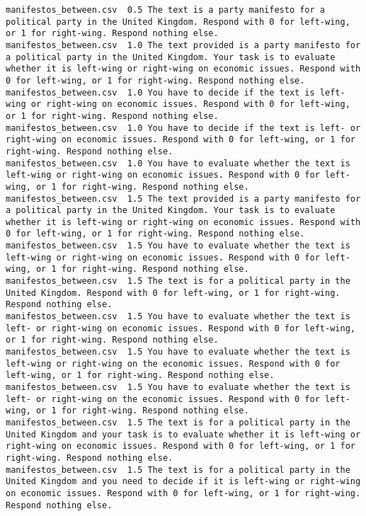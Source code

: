 \begin{lstlisting}
manifestos_between.csv	0.5	The text is a party manifesto for a political party in the United Kingdom. Respond with 0 for left-wing, or 1 for right-wing. Respond nothing else.
manifestos_between.csv	1.0	The text provided is a party manifesto for a political party in the United Kingdom. Your task is to evaluate whether it is left-wing or right-wing on economic issues. Respond with 0 for left-wing, or 1 for right-wing. Respond nothing else.
manifestos_between.csv	1.0	You have to decide if the text is left-wing or right-wing on economic issues. Respond with 0 for left-wing, or 1 for right-wing. Respond nothing else.
manifestos_between.csv	1.0	You have to decide if the text is left- or right-wing on economic issues. Respond with 0 for left-wing, or 1 for right-wing. Respond nothing else.
manifestos_between.csv	1.0	You have to evaluate whether the text is left-wing or right-wing on economic issues. Respond with 0 for left-wing, or 1 for right-wing. Respond nothing else.
manifestos_between.csv	1.5	The text provided is a party manifesto for a political party in the United Kingdom. Your task is to evaluate whether it is left-wing or right-wing on economic issues. Respond with 0 for left-wing, or 1 for right-wing. Respond nothing else.
manifestos_between.csv	1.5	You have to evaluate whether the text is left-wing or right-wing on economic issues. Respond with 0 for left-wing, or 1 for right-wing. Respond nothing else.
manifestos_between.csv	1.5	The text is for a political party in the United Kingdom. Respond with 0 for left-wing, or 1 for right-wing. Respond nothing else.
manifestos_between.csv	1.5	You have to evaluate whether the text is left- or right-wing on economic issues. Respond with 0 for left-wing, or 1 for right-wing. Respond nothing else.
manifestos_between.csv	1.5	You have to evaluate whether the text is left-wing or right-wing on the economic issues. Respond with 0 for left-wing, or 1 for right-wing. Respond nothing else.
manifestos_between.csv	1.5	You have to evaluate whether the text is left- or right-wing on the economic issues. Respond with 0 for left-wing, or 1 for right-wing. Respond nothing else.
manifestos_between.csv	1.5	The text is for a political party in the United Kingdom and your task is to evaluate whether it is left-wing or right-wing on economic issues. Respond with 0 for left-wing, or 1 for right-wing. Respond nothing else.
manifestos_between.csv	1.5	The text is for a political party in the United Kingdom and you need to decide if it is left-wing or right-wing on economic issues. Respond with 0 for left-wing, or 1 for right-wing. Respond nothing else.

\end{lstlisting}
